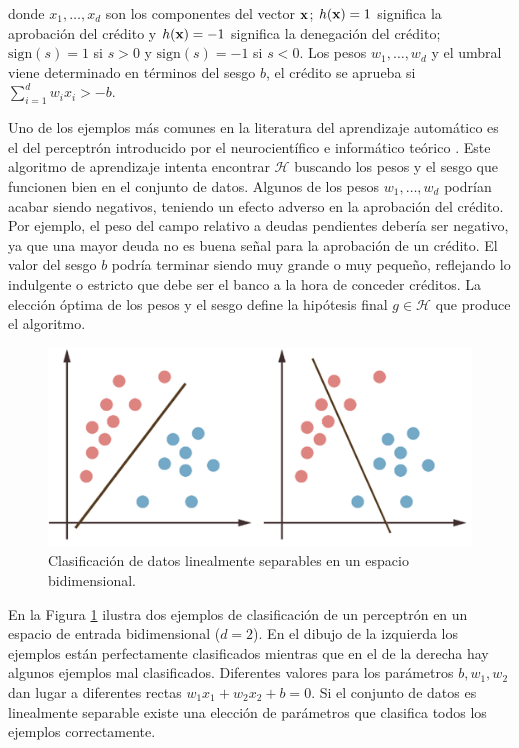 \documentclass[oneside,openright,titlepage,numbers=noenddot,openany,headinclude,footinclude=true,
cleardoublepage=empty,abstractoff,BCOR=5mm,paper=a4,fontsize=12pt,main=spanish]{scrreprt}
\begin{document}
donde $x_1,\dots,x_d$ son los componentes del vector $\textbf{x}$; $h(\textbf{x})=1$ significa la aprobación del crédito y $h(\textbf{x})=-1$ significa la denegación del crédito; $\text{sign}(s)=1$ si $s>0$ y $\text{sign}(s)=-1$ si $s<0$. Los pesos $w_1,\dots,w_d$ y el umbral viene determinado en términos del sesgo $b$, el crédito se aprueba si $\displaystyle \sum_{i=1}^d w_ix_i > -b.$ 

Uno de los ejemplos más comunes en la literatura del aprendizaje automático es el del perceptrón introducido por el neurocientífico e informático teórico \cite{perceptron1957}. Este algoritmo de aprendizaje intenta encontrar $\mathcal{H}$ buscando los pesos y el sesgo que funcionen bien en el conjunto de datos. Algunos de los pesos $w_1,\dots,w_d$ podrían acabar siendo negativos, teniendo un efecto adverso en la aprobación del crédito. Por ejemplo, el peso del campo relativo a deudas pendientes debería ser negativo, ya que una mayor deuda no es buena señal para la aprobación de un crédito. El valor del sesgo $b$ podría terminar siendo muy grande o muy pequeño, reflejando lo indulgente o estricto que debe ser el banco a la hora de conceder créditos. La elección óptima de los pesos y el sesgo define la hipótesis final $g \in \mathcal{H}$ que produce el algoritmo.\\

\begin{figure}[h]
	\centering
	\includegraphics[width=12.4cm]{gbclassified.png}
	\caption{Clasificación de datos linealmente separables en un espacio bidimensional.}
    \label{fig:linsep}
\end{figure}

En la Figura \ref{fig:linsep} ilustra dos ejemplos de clasificación de un perceptrón en un espacio de entrada bidimensional ($d=2$). En el dibujo de la izquierda los ejemplos están perfectamente clasificados mientras que en el de la derecha hay algunos ejemplos mal clasificados. Diferentes valores para los parámetros $b,w_1,w_2$ dan lugar a diferentes rectas $w_1x_1+w_2x_2+b=0$. Si el conjunto de datos es linealmente separable existe una elección de parámetros que clasifica todos los ejemplos correctamente.
\end{document}
